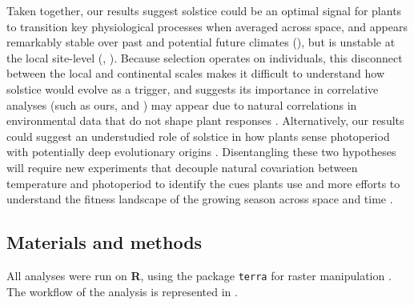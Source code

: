\documentclass[11pt,letter]{article}
\begin{document}
Taken together, our results suggest solstice could be an optimal signal for plants to transition key physiological processes when averaged across space, and appears remarkably stable over past and potential future climates (), but is unstable at the local site-level (, ). Because selection operates on individuals, this disconnect between the local and continental scales makes it difficult to understand how solstice would evolve as a trigger, and suggests its importance in correlative analyses (such as ours, \citealp{Zohner2023} and \citealp{Journe2024}) may appear due to natural correlations in environmental data that do not shape plant responses \citep[e.g.][]{Gao2024}. Alternatively, our results could suggest an understudied role of solstice in how plants sense photoperiod with potentially deep evolutionary origins \citep{morales2024phylogenetic}. Disentangling these two hypotheses will require new experiments that decouple natural covariation between temperature and photoperiod \citep{Buonaiuto2023, Elmendorf2020} to identify the cues plants use and more efforts to understand the fitness landscape of the growing season across space and time \citep{Park2022}.


\subsection*{Materials and methods}

All analyses were run on \textbf{\textsf{R}}, using the package \texttt{terra} for raster manipulation \citep{Hijmans2024}. The workflow of the analysis is represented in .
\end{document}
